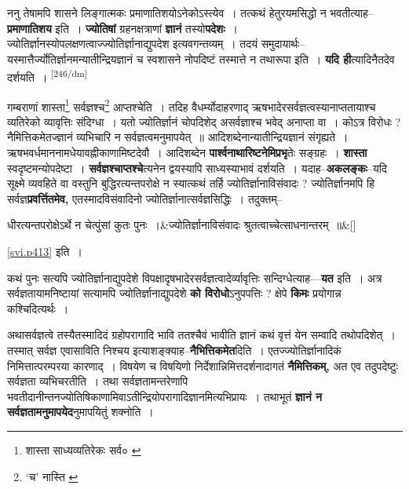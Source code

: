 \documentclass[article,12pt,a4paper]{memoir}
\begin{document}
	  \pstart ननु तेषामपि शासने लिङ्गात्मकः प्रमाणातिशयोऽनेकोऽस्त्येव । तत्कथं हेतुरयमसिद्धो न भवतीत्याह--\textbf{प्रमाणातिशय} इति । \textbf{ज्योतिषां} ग्रहनक्षत्राणां \textbf{ज्ञानं} तस्यो\textbf{पदेशः} । ज्योतिर्ज्ञानस्योपलक्षणत्वाज्ज्योतिर्ज्ञानाद्युपदेश इत्यवगन्तव्यम् । तदयं समुदायार्थः--यस्मात्तैर्ज्योतिर्ज्ञानमन्यातीन्द्रियज्ञानं च स्वशासने नोपदिष्टं तस्मात्ते न तथारूपा इति । \textbf{यदि ही}त्यादिनैतदेव दर्शयति ।  \leavevmode\textsuperscript{\rmlatinfont\tiny [246/dm]} 
	  
	गम्बराणां शास्ता\footnote{शास्ता साध्यव्यतिरेकः सर्व० \cite{dp-msC}} सर्वज्ञश्च\footnote{‘च’ नास्ति \cite{dp-msA} \cite{dp-msB} \cite{dp-edP} \cite{dp-edH} \cite{dp-edE} \cite{dp-edN}} आप्तश्चेति । तदिह वैधर्म्योदाहरणाद् ऋषभादेरसर्वज्ञत्वस्यानाप्ततायाश्च व्यतिरेको व्यावृत्तिः संदिग्धा । यतो ज्योतिर्ज्ञानं चोपदिशेद् असर्वज्ञाश्च भवेद् अनाप्ता वा । कोऽत्र विरोधः ? नैमित्तिकमेतज्ज्ञानं व्यभिचारि न सर्वज्ञत्वमनुमापयेत् ॥ आदिशब्देनान्यातीन्द्रियज्ञानं संगृह्यते । ऋषभवर्धमाननामधेयावह्नीकाणामिष्टदेवौ । आदिशब्देन \textbf{पार्श्वनाथारिष्टनेमिप्रभृ}तेः सङ्ग्रहः । \textbf{शास्ता} स्वदृष्टमन्योपदेष्टा । \textbf{सर्वज्ञश्चाप्तश्चे}त्यनेन द्वयस्यापि साध्यस्याभावं दर्शयति । यदाह--\textbf{अकलङ्कः}--यदि सूक्ष्मे व्यवहिते वा वस्तुनि बुद्धिरत्यन्तपरोक्षे न स्यात्कथं तर्हि ज्योतिर्ज्ञानाविसंवादः ? ज्योतिर्ज्ञानमपि हि सर्वज्ञ\textbf{प्रवर्त्तितमेव,} एतस्मादविसंवादिनो ज्योतिर्ज्ञानात्सर्वज्ञसिद्धिः । तदुक्तम्--
	\pend
      
	    
	    \stanza[\smallbreak]
धीरत्यन्तपरोक्षेऽर्थे न चेत्पुंसां कुतः पुनः ।&ज्योतिर्ज्ञानाविसंवादः श्रुतत्वाच्चेत्साधनान्तरम् ॥\&[\smallbreak]


	\cref{svi.p413} इति ।

	  \pstart कथं पुनः सत्यपि ज्योतिर्ज्ञानाद्युपदेशे विपक्षादृषभादेरसर्वज्ञत्वादेर्व्यावृत्तिः सन्दिग्धेत्याह—\textbf{यत} इति । अत्र सर्वज्ञतायामनिष्टायां सत्यामपि ज्योतिर्ज्ञानाद्युपदेशे \textbf{को विरोधो}ऽनुपपत्तिः ? क्षेपे \textbf{किमः} प्रयोगान्न कश्चिदित्यर्थः ।
	\pend
      

	  \pstart अथासर्वज्ञत्वे तस्यैतस्मादिदं ग्रहोपरागादि भावि ततश्चैवं भावीति ज्ञानं कथं वृत्तं येन सम्वादि तथोपदिशेत् । तस्मात् सर्वज्ञ एवासाविति निश्चय इत्याशङ्क्याह--\textbf{नैभित्तिकमेत}दिति । एतज्ज्योतिर्ज्ञानादिकं निमित्तात्परम्परया कारणाद् । विषयेण च विषयिणो निर्देशान्निमित्तदर्शनादागतं \textbf{नैमित्तिकम्,} अत एव तदुपदेष्टुः सर्वज्ञता व्यभिचरतीति । तथा सर्वज्ञतामन्तरेणापि भवतीदानीन्तनज्योतिषिकाणामिवाऽतीन्द्रियोपरागादिज्ञानमित्यभिप्रायः । तथाभूतं \textbf{ज्ञानं न सर्वज्ञतामनुमापयेद}नुमापयितुं शक्नोति ।
	\pend
      
\end{document}
